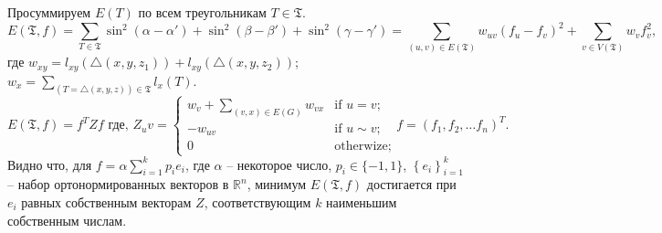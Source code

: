 \documentclass{article}
\begin{document}
Просуммируем $E(T)$ по всем треугольникам $T \in \mathfrak{T}$.
\begin{equation*}
  E(\mathfrak{T}, f) = \sum_{T \in \mathfrak{T}} \sin^2(\alpha - \alpha') + \sin^2(\beta - \beta') + \sin^2(\gamma - \gamma') = \sum_{(u, v) \in E(\mathfrak{T})} w_{uv} (f_u - f_v)^2 + 
  \sum_{v \in V(\mathfrak{T})} w_v f_v^2,
\end{equation*}
где $w_{xy} = l_{xy}(\triangle (x, y, z_1)) + l_{xy}(\triangle (x,y,z_2))$; $w_x = \sum_{\left(T = \triangle (x, y, z)\right) \in \mathfrak{T}} l_x(T)$.
\begin{equation*}
  E(\mathfrak{T}, f) = f^T Z f \mbox{ где, } Z_uv = \begin{cases}
  w_v + \sum_{(v, x) \in E(G)}{w_{vx}}&\text{if $u = v;$} \\
  -w_{uv}&\text{if $u \sim v;$} \\
  0 &\text{otherwize;}
    \end{cases} f = (f_1, f_2, \dots f_n)^T.
\end{equation*}
Видно что, для $f = \alpha \sum_{i=1}^k p_i e_i$, где $\alpha$ -- некоторое число, $p_i \in \{-1, 1 \}$, 
$\left\{e_i\right\}_{i=1}^k$ -- набор ортонормированных векторов в $\mathbb{R}^n$, минимум $E(\mathfrak{T}, f)$ достигается при $e_i$ равных собственным векторам 
$Z$, соответствующим $k$ наименьшим собственным числам.
\end{document}
